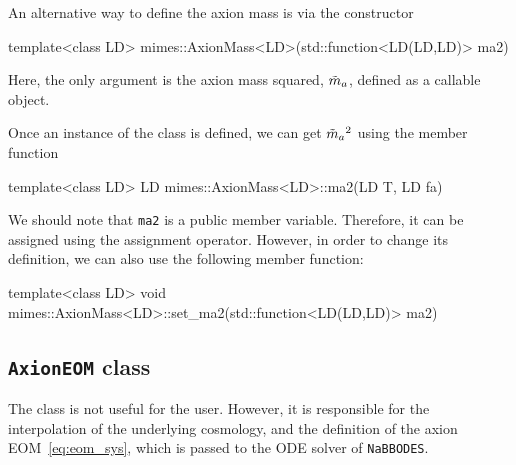 \documentclass[11pt,a4paper]{article}
\begin{document}
An alternative way to define the axion mass is via the constructor
%
\begin{cpp}
	template<class LD>
	mimes::AxionMass<LD>(std::function<LD(LD,LD)> ma2)
\end{cpp}
%
Here, the only argument is the axion mass squared, $\tilde m_{a}{}$, defined as a callable object.


Once an instance of the class is defined, we can get $\tilde m_{a}{}^2$ using the member function
%
\begin{cpp}
	template<class LD>	LD mimes::AxionMass<LD>::ma2(LD T, LD fa)
\end{cpp}
%
We should note that {\tt ma2} is a public  member variable. Therefore, it can be assigned using the assignment operator. However,  in order to change its definition, we can also use the following member function:
%
\begin{cpp}
	template<class LD> void mimes::AxionMass<LD>::set_ma2(std::function<LD(LD,LD)> ma2)
\end{cpp}


\subsection{{\tt AxionEOM} class}
%
The  class is not useful for the user. However, it is responsible for the interpolation of the underlying cosmology, and the definition of the axion EOM~\ref{eq:eom_sys}, which is passed to the ODE solver of {\tt NaBBODES}. 
\end{document}
